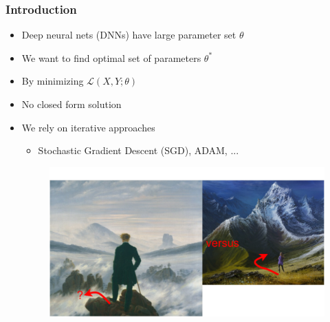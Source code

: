\documentclass[9pt]{beamer}
\begin{document}
\begin{frame}
\frametitle{Introduction}
\begin{itemize}%
	\item Deep neural nets (DNNs) have large parameter set $\theta$%
	\item We want to find optimal set of parameters $\theta^*$
	\item By minimizing $\mathcal{L}(X,Y;\theta)$
	\item No closed form solution
	\item We rely on iterative approaches
	\begin{itemize}
		\item Stochastic Gradient Descent (SGD), ADAM, ...
	\end{itemize}
	\begin{figure}
		\includegraphics[width=.8\linewidth]{figures/llv.pdf}
	\end{figure}
\end{itemize}
\end{frame} 
\end{document}
